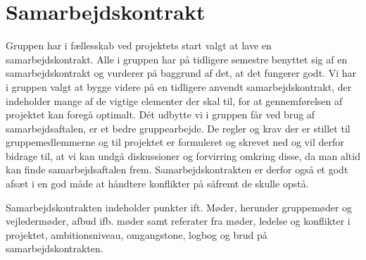 \section{Samarbejdskontrakt}
Gruppen har i fællesskab ved projektets start valgt at lave en samarbejdskontrakt. Alle i gruppen har på tidligere semestre benyttet sig af en samarbejdskontrakt og vurderer på baggrund af det, at det fungerer godt. Vi har i gruppen valgt at bygge videre på en tidligere anvendt samarbejdskontrakt, der indeholder mange af de vigtige elementer der skal til, for at gennemførelsen af projektet kan foregå optimalt. Dét udbytte vi i gruppen får ved brug af samarbejdsaftalen, er et bedre gruppearbejde. De regler og krav der er stillet til gruppemedlemmerne og til projektet er formuleret og skrevet ned og vil derfor bidrage til, at vi kan undgå diskussioner og forvirring omkring disse, da man altid kan finde samarbejdsaftalen frem. Samarbejdskontrakten er derfor også et godt afsæt i en god måde at håndtere konflikter på såfremt de skulle opstå.

\vspace{0.2 cm}
Samarbejdskontrakten indeholder punkter ift. Møder, herunder gruppemøder og vejledermøder, afbud ifb. møder samt referater fra møder, ledelse og konflikter i projektet, ambitionsniveau, omgangstone, logbog og brud på samarbejdskontrakten.